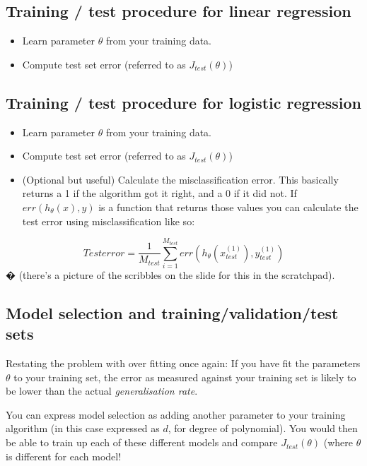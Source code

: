 \subsection{Training / test procedure for linear regression}

\begin{itemize}
\item Learn parameter $\theta$ from your training data.
\item Compute test set error (referred to as $J_{test}(\theta)$)
\end{itemize}

\subsection{Training / test procedure for logistic regression}

\begin{itemize}
\item Learn parameter $\theta$ from your training data.
\item Compute test set error (referred to as $J_{test}(\theta)$)
\item (Optional but useful) Calculate the misclassification error. This basically returns a 1 if the algorithm got it right, and a 0 if it did not. If $err(h_\theta(x), y)$ is a function that returns those values you can calculate the test error using misclassification like so:
\end{itemize}

\begin{equation}
Test error = \frac{1}{M_{test}} \sum_{i = 1}^{M_{test}}err(h_\theta(x^{(1)}_{test}), y^{(1)}_{test})
\end{equation}�
(there's a picture of the scribbles on the slide for this in the scratchpad).

\subsection{Model selection and training/validation/test sets}

Restating the problem with over fitting once again: If you have fit the parameters $\theta$ to your training set, the error as measured against your training set is likely to be lower than the actual \emph{generalisation rate}.

You can express model selection as adding another parameter to your training algorithm (in this case expressed as $d$, for degree of polynomial). You would then be able to train up each of these different models and compare $J_{test}(\theta)$ (where $\theta$ is different for each model!

